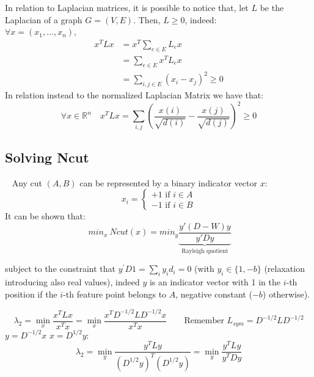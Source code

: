 \begin{defn}{} In relation to Laplacian matrices, it is possible to notice that, let $L$ be the Laplacian of a graph $G=(V,E)$. Then, $L \geq 0$, indeed:\\
	$\forall x = (x_1, \dots, x_n),$
	$$\begin{aligned} x^{T}Lx &= x^{T} \sum_{e \in E} L_{e} x \\ &=\sum_{e \in E} x^T L_{e} x \\ &=\sum_{i, j \in E}\left(x_{i}-x_{j}\right)^{2} \geq 0 \end{aligned}$$
	In relation instead to the normalized Laplacian Matrix we have that:
	$$\forall x \in \mathbb{R}^n \quad x^TLx = \sum_{i,j} \left(\frac{x(i)}{\sqrt{d(i)}} - \frac{x(j)}{\sqrt{d(j)}} \right)^2 \geq 0$$
\end{defn}
\par \bigskip \bigskip \noindent


\subsection{Solving Ncut}~\label{solveNcutTheory}
Any cut $(A,B)$ can be represented by a binary indicator vector $x$:
$$x_i = \begin{cases}
+1 \text{  if } i \in A\\
-1 \text{  if } i \in B
\end{cases}$$
It can be shown that:
\begin{equation}~\label{solvencut}
min_x ~ Ncut(x) = min_y \underbrace{\frac{y'(D-W)y}{y'Dy}}_{\text{Rayleigh quotient}}
\end{equation}

subject to the constraint that $y ^ { \prime } D1 = \sum_{i} y_{i} d _ { i } = 0$ (with $y _ { i } \in \{ 1 , - b \}$ (relaxation introducing also real values), indeed $y$ is an indicator vector with 1 in the $i$-th position if the $i$-th feature point belongs to $A$, negative constant ($-b$) otherwise).

\begin{thm}{}
	$$\lambda_2 = \min_x \frac{x^TLx}{x^Tx} = \min_x \frac{x^TD^{-1/2}LD^{-1/2}x}{x^Tx} \qquad \text{Remember } L_{sym} = D^{-1/2}LD^{-1/2}$$
	 $y=D^{-1/2}x$  $x = D^{1/2}y$:
	$$\lambda_2 = \min_y \frac{y^TLy}{(D^{1/2}y)^T(D^{1/2}y)} = \min_y \frac{y^TLy}{y^TDy}$$
\end{thm}

